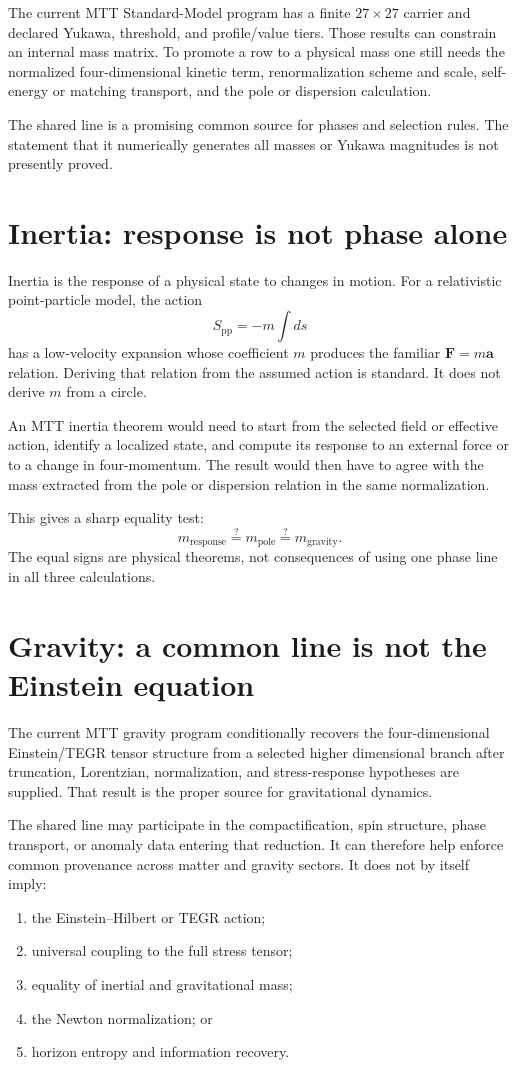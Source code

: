 \documentclass[11pt]{article}
\begin{document}
The current MTT Standard-Model program has a finite \(27\times27\) carrier and
declared Yukawa, threshold, and profile/value tiers. Those results can
constrain an internal mass matrix. To promote a row to a physical mass one
still needs the normalized four-dimensional kinetic term, renormalization
scheme and scale, self-energy or matching transport, and the pole or
dispersion calculation.

The shared line is a promising common source for phases and selection rules.
The statement that it numerically generates all masses or Yukawa magnitudes
is not presently proved.

\section{Inertia: response is not phase alone}

Inertia is the response of a physical state to changes in motion. For a
relativistic point-particle model, the action
\[
 S_{\mathrm{pp}}=-m\int ds
\]
has a low-velocity expansion whose coefficient \(m\) produces the familiar
\(\mathbf F=m\mathbf a\) relation. Deriving that relation from the assumed
action is standard. It does not derive \(m\) from a circle.

An MTT inertia theorem would need to start from the selected field or
effective action, identify a localized state, and compute its response to an
external force or to a change in four-momentum. The result would then have to
agree with the mass extracted from the pole or dispersion relation in the
same normalization.

This gives a sharp equality test:
\[
 m_{\mathrm{response}}
 \stackrel{?}{=}
 m_{\mathrm{pole}}
 \stackrel{?}{=}
 m_{\mathrm{gravity}} .
\]
The equal signs are physical theorems, not consequences of using one phase
line in all three calculations.

\section{Gravity: a common line is not the Einstein equation}

The current MTT gravity program conditionally recovers the
four-dimensional Einstein/TEGR tensor structure from a selected higher
dimensional branch after truncation, Lorentzian, normalization, and
stress-response hypotheses are supplied. That result is the proper source
for gravitational dynamics.

The shared line may participate in the compactification, spin structure,
phase transport, or anomaly data entering that reduction. It can therefore
help enforce common provenance across matter and gravity sectors. It does not
by itself imply:
\begin{enumerate}
\item the Einstein--Hilbert or TEGR action;
\item universal coupling to the full stress tensor;
\item equality of inertial and gravitational mass;
\item the Newton normalization; or
\item horizon entropy and information recovery.
\end{enumerate}
\end{document}
